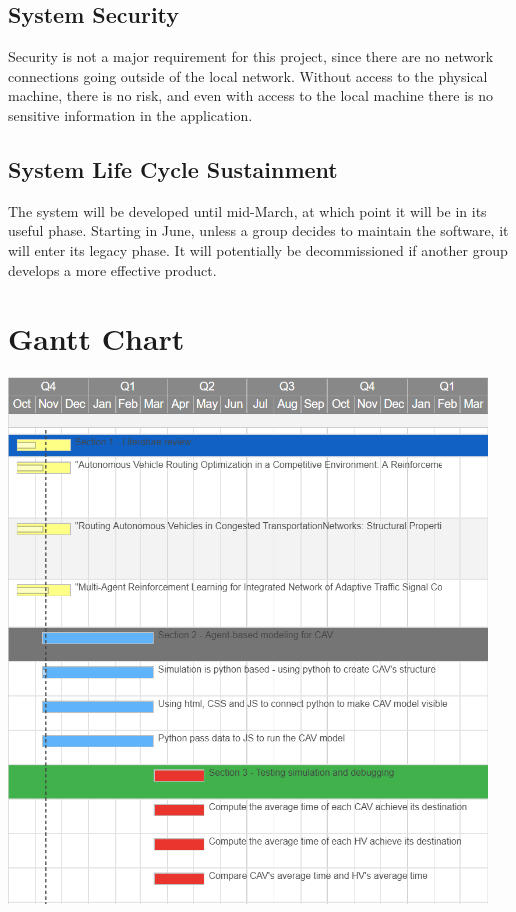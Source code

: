 \documentclass[onecolumn, draftclsnofoot,10pt, compsoc]{IEEEtran}
\begin{document}
\subsection{System Security}
Security is not a major requirement for this project, since there are no network connections going outside of the local network.
Without access to the physical machine, there is no risk, and even with access to the local machine there is no sensitive information in the application.
\subsection{System Life Cycle Sustainment}
The system will be developed until mid-March, at which point it will be in its useful phase.
Starting in June, unless a group decides to maintain the software, it will enter its legacy phase.
It will potentially be decommissioned if another group develops a more effective product.
\section{Gantt Chart}
\includegraphics[width=5in]{gantt_chart}
\end{document}
